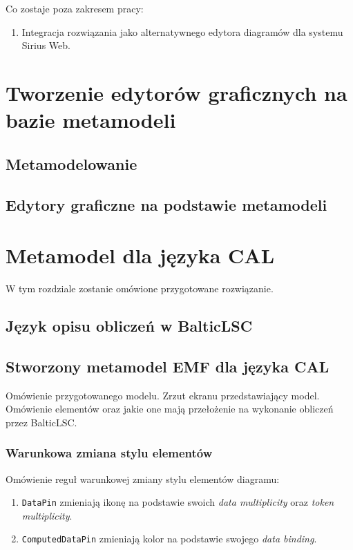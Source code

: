 \noindent Co zostaje poza zakresem pracy:

\begin{enumerate}
	\item Integracja rozwiązania jako alternatywnego edytora diagramów dla systemu Sirius Web.
\end{enumerate}

\chapter{Tworzenie edytorów graficznych na bazie metamodeli}

\section{Metamodelowanie}

\section{Edytory graficzne na podstawie metamodeli}

\chapter{Metamodel dla języka CAL}

W tym rozdziale zostanie omówione przygotowane rozwiązanie.

\section{Język opisu obliczeń w BalticLSC}

\section{Stworzony metamodel EMF dla języka CAL}

Omówienie przygotowanego modelu. Zrzut ekranu przedstawiający model. Omówienie
elementów oraz jakie one mają przełożenie na wykonanie obliczeń przez
BalticLSC\@.

\subsection{Warunkowa zmiana stylu elementów}

Omówienie reguł warunkowej zmiany stylu elementów diagramu:

\begin{enumerate}
	\item \texttt{DataPin} zmieniają ikonę na podstawie swoich \textit{data
		      multiplicity} oraz \textit{token multiplicity}.
	\item \texttt{ComputedDataPin} zmieniają kolor na podstawie swojego
	      \textit{data binding}.
\end{enumerate}

